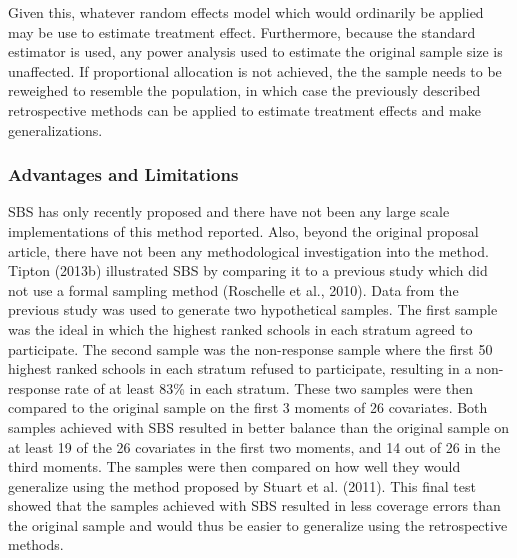 \documentclass[man,floatsintext]{apa6}
\theoremstyle{definition}
\theoremstyle{definition}
\theoremstyle{definition}
\theoremstyle{remark}
\begin{document}
Given this, whatever random effects model which would ordinarily be
applied may be use to estimate treatment effect. Furthermore, because
the standard estimator is used, any power analysis used to estimate the
original sample size is unaffected. If proportional allocation is not
achieved, the the sample needs to be reweighed to resemble the
population, in which case the previously described retrospective methods
can be applied to estimate treatment effects and make generalizations.

\hypertarget{advantages-and-limitations}{%
\subsubsection{Advantages and
Limitations}\label{advantages-and-limitations}}

SBS has only recently proposed and there have not been any large scale
implementations of this method reported. Also, beyond the original
proposal article, there have not been any methodological investigation
into the method. Tipton (2013b) illustrated SBS by comparing it to a
previous study which did not use a formal sampling method (Roschelle et
al., 2010). Data from the previous study was used to generate two
hypothetical samples. The first sample was the ideal in which the
highest ranked schools in each stratum agreed to participate. The second
sample was the non-response sample where the first 50 highest ranked
schools in each stratum refused to participate, resulting in a
non-response rate of at least 83\% in each stratum. These two samples
were then compared to the original sample on the first 3 moments of 26
covariates. Both samples achieved with SBS resulted in better balance
than the original sample on at least 19 of the 26 covariates in the
first two moments, and 14 out of 26 in the third moments. The samples
were then compared on how well they would generalize using the method
proposed by Stuart et al. (2011). This final test showed that the
samples achieved with SBS resulted in less coverage errors than the
original sample and would thus be easier to generalize using the
retrospective methods.
\end{document}

